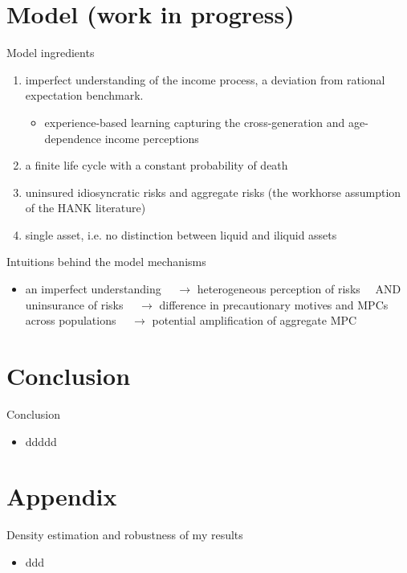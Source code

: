 \documentclass{beamer}
\begin{document}
\section{Model (work in progress)}

\begin{frame}{Model ingredients}
	
	\begin{enumerate}
		\item imperfect understanding of the income process, a deviation from rational expectation benchmark. 
		\begin{itemize}
			\item experience-based learning capturing the cross-generation and age-dependence income perceptions
		\end{itemize}
		\item a finite life cycle with a constant probability of death 
		\item uninsured idiosyncratic risks and aggregate risks (the workhorse assumption of the HANK literature) 
		\item single asset, i.e. no distinction between liquid and iliquid assets 
	\end{enumerate}
\end{frame}

\begin{frame}{Intuitions behind the model mechanisms}
	\begin{itemize}
		\item an imperfect understanding $ \quad \rightarrow$ heterogeneous perception of risks $ \quad \text{AND } $ uninsurance of risks $ \quad \rightarrow$ difference in precautionary motives and MPCs across populations $ \quad \rightarrow$ potential amplification of aggregate MPC
	\end{itemize}
\end{frame}





\section{Conclusion}

\begin{frame}{Conclusion}
	\begin{itemize}
		\item ddddd
	\end{itemize}	
\end{frame}

\section*{Appendix}

\begin{frame}{Density estimation and robustness of my results}
	\begin{itemize}
		\item ddd
	\end{itemize}
\end{frame}




\end{document}
